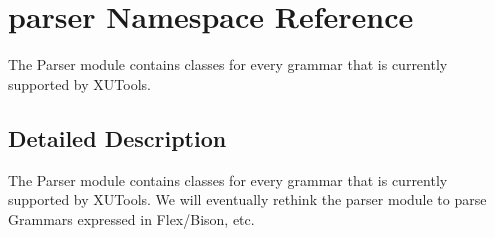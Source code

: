 \hypertarget{namespaceparser}{\section{parser Namespace Reference}
\label{namespaceparser}
}


The Parser module contains classes for every grammar that is currently supported by X\-U\-Tools.  




\subsection{Detailed Description}
The Parser module contains classes for every grammar that is currently supported by X\-U\-Tools. We will eventually rethink the parser module to parse Grammars expressed in Flex/\-Bison, etc. 